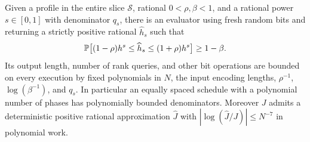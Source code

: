 \begin{proposition}\label{prop:weight-evaluator}
Given a profile in the entire slice $\mathcal S$, rational
$0<\rho,\beta<1$, and a rational power $s\in[0,1]$ with denominator
$q_s$, there is an evaluator using fresh random bits and returning a strictly positive rational
$\widehat h_s$ such that
\[
 \mathbb P\bigl[(1-\rho)h^s\le\widehat h_s\le(1+\rho)h^s\bigr]
       \ge1-\beta.
\]
Its output length, number of rank queries, and other bit operations
are bounded on every execution by fixed polynomials in $N$, the
input encoding lengths, $\rho^{-1}$, $\log(\beta^{-1})$, and $q_s$.
In particular an equally spaced schedule with a polynomial number of
phases has polynomially bounded denominators. Moreover $J$ admits
a deterministic positive rational approximation $\widehat J$ with
$|\log(\widehat J/J)|\le N^{-7}$ in polynomial work.
\end{proposition}

